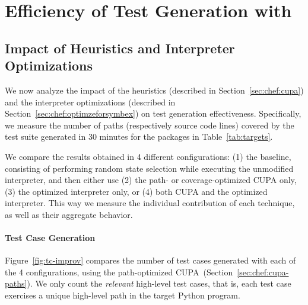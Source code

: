 
\section{Efficiency of Test Generation with \chef}
\label{sec:eval:chef-efficiency}

\subsection{Impact of \cupa Heuristics and Interpreter Optimizations}
\label{sec:sub:perf-cupa}

We now analyze the impact of the \cupa heuristics (described in Section~\ref{sec:chef:cupa}) and the interpreter optimizations (described in Section~\ref{sec:chef:optimzeforsymbex}) on test generation effectiveness.  Specifically, we measure the number of paths (respectively source code lines) covered by the test suite generated in 30 minutes for the packages in Table~\ref{tab:targets}.

We compare the results obtained in 4 different configurations: (1) the baseline, consisting of performing random state selection while executing the unmodified interpreter, and then either use (2) the path- or coverage-optimized CUPA only, (3) the optimized interpreter only, or (4) both CUPA and the optimized interpreter.  This way we measure the individual contribution of each technique, as well as their aggregate behavior.

\paragraph{Test Case Generation}

Figure~\ref{fig:tc-improv} compares the number of test cases generated with each of the 4 \chef configurations, using the path-optimized CUPA~(Section~\ref{sec:chef:cupa-paths}).  We only count the \textit{relevant} high-level test cases, that is, each test case exercises a unique high-level path in the target Python program.

